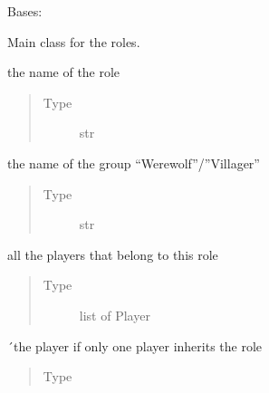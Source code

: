 \documentclass[letterpaper,10pt,english]{sphinxmanual}
\begin{document}
\begin{fulllineitems}
Bases: 

Main class for the roles.


\begin{fulllineitems}
the name of the role
\begin{quote}\begin{description}
\item[{Type}] \leavevmode
str

\end{description}\end{quote}

\end{fulllineitems}



\begin{fulllineitems}
the name of the group “Werewolf”/”Villager”
\begin{quote}\begin{description}
\item[{Type}] \leavevmode
str

\end{description}\end{quote}

\end{fulllineitems}



\begin{fulllineitems}
all the players that belong to this role
\begin{quote}\begin{description}
\item[{Type}] \leavevmode
list of Player

\end{description}\end{quote}

\end{fulllineitems}



\begin{fulllineitems}
´the player if only one player inherits the role
\begin{quote}\begin{description}
\item[{Type}] \leavevmode
{\hyperref[\detokenize{chatwolf:chatwolf.player.Player}]{}}


\end{description}
\end{quote}
\end{fulllineitems}
\end{fulllineitems}
\end{document}
